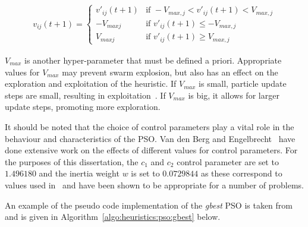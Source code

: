 \begin{equation}
      \label{eq:heuristics:pso:velocity_clamping}
      \begin{split}
            v_{ij}(t+1)=
            \begin{cases}
                  v'_{ij}(t+1) & \text{if } -V_{max,j} < v'_{ij}(t+1) < V_{max,j} \\
                  -V_{maxj}    & \text{if } v'_{ij}(t+1) \leq -V_{max,j}          \\
                  V_{maxj}     & \text{if } v'_{ij}(t+1) \geq V_{max,j}
            \end{cases}
      \end{split}
\end{equation}

\noindent
$V_{max}$ is another hyper-parameter that must be defined a priori. Appropriate values for $V_{max}$ may prevent swarm explosion, but also has an effect on the exploration and exploitation of the heuristic. If $V_{max}$ is small, particle update steps are small, resulting in exploitation~\cite{ref:eberhart:1996}. If $V_{max}$ is big, it allows for larger update steps, promoting more exploration.

It should be noted that the choice of control parameters play a vital role in the behaviour and characteristics of the \acs{PSO}. Van den Berg and Engelbrecht~\cite{ref:vandenberg:2007, ref:vandenberg:2006} have done extensive work on the effects of different values for control parameters. For the purposes of this dissertation, the $c_{1}$ and $c_{2}$ control parameter are set to $1.496180$ and the inertia weight $w$ is set to $0.0729844$ as these correspond to values used in~\cite{ref:eberhart:2000} and have been shown to be appropriate for a number of problems.

An example of the pseudo code implementation of the \textit{gbest} \acs{PSO} is taken from~\cite{ref:engelbrecht:2007} and is given in Algorithm~\ref{algo:heuristics:pso:gbest} below.

